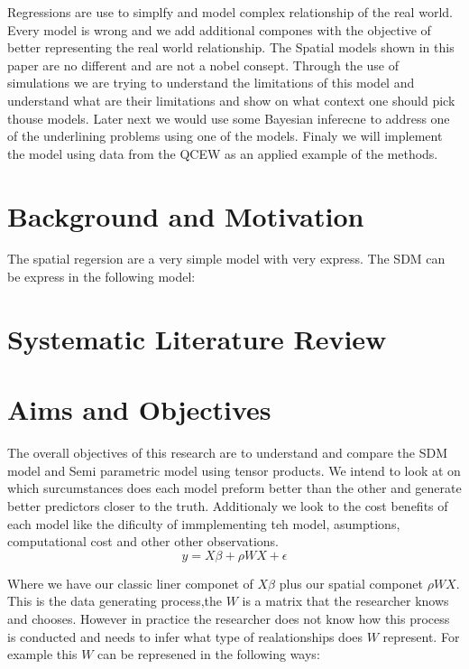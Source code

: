 \documentclass{article}
\begin{document}
Regressions are use to simplfy and model complex relationship of the real world. Every model is wrong and we add
additional compones with the objective of better representing the real world relationship. The Spatial models
shown in this paper are no different and are not a nobel consept. Through the use of simulations we are trying
to understand the limitations of this model and understand what are their limitations and show on what context
one should pick thouse models. Later next we would use some Bayesian inferecne to address one of the underlining
problems using one of the models. Finaly we will implement the model using data from the QCEW as an applied example of the
methods.


\section{Background and Motivation}

The spatial regersion are a very simple model with very express. The SDM can be express in the following model:


\section{Systematic Literature Review}

\section{Aims and Objectives}

The overall objectives of this research are to understand and compare the SDM model and Semi parametric
model using tensor products. We intend to look at on which surcumstances does each model preform better than the
other and generate better predictors closer to the truth. Additionaly we look to the cost benefits of each model
like the dificulty of immplementing teh model, asumptions, computational cost and other other observations.
\begin{equation}
	y = X \beta + \rho W X + \epsilon
\end{equation}

Where we have our classic liner componet of $X\beta$ plus our spatial componet $\rho W X$. This is the data generating
process,the $W$ is a matrix that the researcher knows and chooses. However in practice the researcher does not know how
this process is conducted and needs to infer what type of realationships does $W$ represent. For example this $W$ can be represened
in the following ways:
\end{document}
